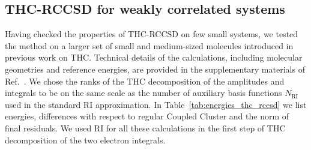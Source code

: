 \subsection{{THC-RCCSD for weakly correlated systems}
\label{sec:thc_weakly_correlated}}
Having checked the properties of THC-RCCSD on few small systems, we 
tested the method on a larger set of small and medium-sized molecules introduced 
in previous work on THC.\cite{hohenstein_thc3} Technical details of the 
calculations, including molecular geometries and reference energies, are 
provided in the supplementary materials of Ref.~\cite{schutski2017tensor}. We 
chose the ranks of the THC decomposition of the amplitudes and integrals to be 
on the same scale as the number of auxiliary basis functions $N_\mathrm{RI}$ 
used in the standard RI approximation. In Table~\ref{tab:energies_thc_rccsd} we 
list 
energies, differences with respect to regular Coupled Cluster and the norm of 
final residuals. We used RI for all these calculations 
in the first step of THC decomposition of the two electron integrals. 
%
